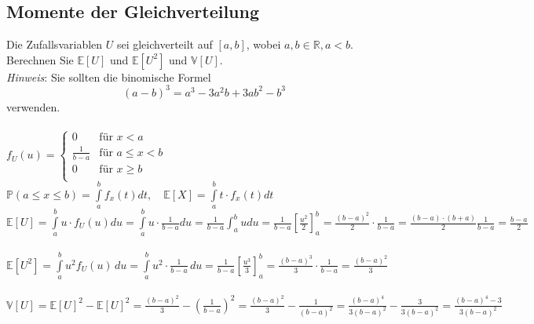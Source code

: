 \documentclass[a4paper]{article}
\begin{document}
\subsection{Momente der Gleichverteilung}
Die Zufallsvariablen $U$ sei gleichverteilt auf $[a, b]$, wobei $a, b \in \mathbb{R}, a < b$. Berechnen Sie $\mathbb{E}[U ]$ und
$\mathbb{E}[U^2]$ und $\mathbb{V}[U]$.\\
\textit{Hinweis}: Sie sollten die binomische Formel
\[(a-b)^3= a^3-3a^2b + 3ab^2-b^3\] verwenden.\\\\
\(f_U(u)=\begin{cases}
        0 & \text{für } x<a\\
        \frac{1}{b-a} & \text{für } a \leq x < b\\
        0 & \text{für } x \geq b\\
\end{cases}\)\\
\(\mathbb{P}(a\leq x \leq b)= \int\limits^b_af_x(t)dt, \quad \mathbb{E}[X]= \int\limits^b_a t\cdot f_x(t)dt\)\\
\(\mathbb{E}[U] = \int\limits^b_a u\cdot f_U(u)du = \int\limits^b_a u\cdot \frac{1}{b-a} du = \frac{1}{b-a}\int^b_a udu  = \frac{1}{b-a}\left[\frac{u^2}{2}\right]^b_a= \frac{(b-a)^2}{2}\cdot \frac{1}{b-a}= \frac{(b-a)\cdot (b+a)}{2}\frac{1}{b-a} = \frac{b-a}{2}\)\\\\
\(\mathbb{E}[U^2]=\int\limits^b_a u^2 f_U(u)\, du = \int\limits^b_a u^2\cdot \frac{1}{b-a}\, du = \frac{1}{b-a}\left[\frac{u^3}{3}\right]^b_a=\frac{(b-a)^3}{3}\cdot \frac{1}{b-a}= \frac{(b-a)^2}{3} \)\\\\
\(\mathbb{V}[U]= \mathbb{E}[U]^2-\mathbb{E}[U]^2 = \frac{(b-a)^2}{3} - \left(\frac{1}{b-a}\right)^2=\frac{(b-a)^2}{3} - \frac{1}{(b-a)^2} = \frac{(b-a)^4}{3(b-a)^2}-\frac{3}{3(b-a)^2}=\frac{(b-a)^4-3}{3(b-a)^2}\)
\end{document}
